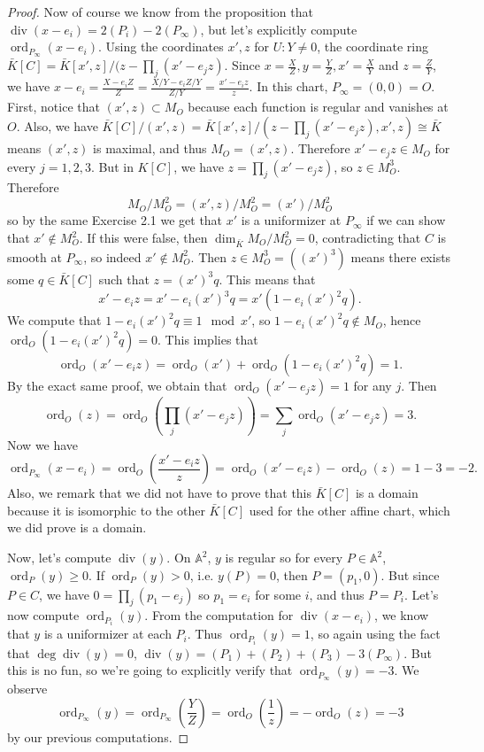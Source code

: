 \documentclass{article}
\theoremstyle{customplain}
\theoremstyle{customdef}
\renewcommand{\div}{\mathop{\mathrm{div}}}
\newcommand{\A}{\mathbb{A}}
\DeclareMathOperator{\ord}{ord}
\theoremstyle{definition} %
\renewcommand{\ge}{\geqslant}
\begin{document}
\begin{proof}
    Now of course we know from the proposition that $\div(x-e_i)=2(P_i)-2(P_\infty)$, but let's explicitly compute $\ord_{P_\infty}(x-e_i).$ Using the coordinates $x',z$ for $U:Y\ne 0$, the coordinate ring $\bar K[C]=\bar K[x',z]/(z-\prod_j(x'-e_jz).$ Since $x=\frac{X}{Z}, y = \frac{Y}{Z}, x'=\frac{X}{Y}$ and $z=\frac{Z}{Y}$, we have $x-e_i = \frac{X-e_iZ}{Z}=\frac{X/Y-e_iZ/Y}{Z/Y}=\frac{x'-e_iz}{z}.$ In this chart, $P_\infty = (0,0)=O$. First, notice that $(x',z)\subset M_O$ because each function is regular and vanishes at $O$. Also, we have $\bar K[C]/(x',z)=\bar K[x',z]/(z-\prod_j(x'-e_jz),x',z)\cong \bar K$ means $(x', z)$ is maximal, and thus $M_O = (x', z).$ Therefore $x'-e_jz \in M_O$ for every $j=1,2,3.$ But in $K[C]$, we have $z=\prod_j(x'-e_jz)$, so $z\in M_O^3.$ Therefore
    \[
    M_O/M_O^2 = (x',z)/M_O^2 = (x')/M_O^2
    \]
    so by the same Exercise 2.1 we get that $x'$ is a uniformizer at $P_\infty$ if we can show that $x'\notin M_O^2.$ If this were false, then $\dim_{\bar K} M_O/M_O^2=0$, contradicting that $C$ is smooth at $P_\infty$, so indeed $x'\notin M_O^2.$ Then $z\in M_O^3=((x')^3)$ means there exists some $q\in \bar K[C]$ such that $z=(x')^3q.$ This means that \[
    x'-e_iz = x'-e_i(x')^3q=x'(1-e_i(x')^2q).
    \]
    We compute that $1-e_i(x')^2q\equiv 1 \mod x'$, so $1-e_i(x')^2 q \notin M_O$, hence $\ord_O(1-e_i(x')^2 q)=0.$ This implies that
    \[
    \ord_O(x'-e_iz)=\ord_O(x')+\ord_O(1-e_i(x')^2q) = 1.
    \]
    By the exact same proof, we obtain that $\ord_O(x'-e_j z)=1$ for any $j$. Then
    \[
    \ord_O(z)= \ord_O(\prod_j(x'-e_jz)) = \sum_j \ord_O(x'-e_jz) = 3.
    \]
    Now we have
    \[
    \ord_{P_\infty}(x-e_i) = \ord_O(\frac{x'-e_iz}{z})=\ord_O(x'-e_iz)-\ord_O(z)=1-3=-2.
    \]
    Also, we remark that we did not have to prove that this $\bar K[C]$ is a domain because it is isomorphic to the other $\bar K[C]$ used for the other affine chart, which we did prove is a domain.

    Now, let's compute $\div(y).$ On $\A^2$, $y$ is regular so for every $P\in \A^2$, $\ord_P(y)\ge 0.$ If $\ord_P(y)>0$, i.e. $y(P)=0$, then $P=(p_1, 0)$. But since $P\in C$, we have $0=\prod_j(p_1-e_j)$ so $p_1=e_i$ for some $i$, and thus $P=P_i.$ Let's now compute $\ord_{P_i}(y).$ From the computation for $\div(x-e_i)$, we know that $y$ is a uniformizer at each $P_i.$ Thus $\ord_{P_i}(y)=1$, so again using the fact that $\deg \div (y)=0$, $\div(y)=(P_1)+(P_2)+(P_3)-3(P_\infty).$ But this is no fun, so we're going to explicitly verify that $\ord_{P_\infty}(y)=-3.$ We observe
    \[
    \ord_{P_\infty}(y)=\ord_{P_\infty}(\frac{Y}{Z})=\ord_{O}(\frac{1}{z})=-\ord_O(z)=-3
    \]
    by our previous computations.


\end{proof}
\end{document}
